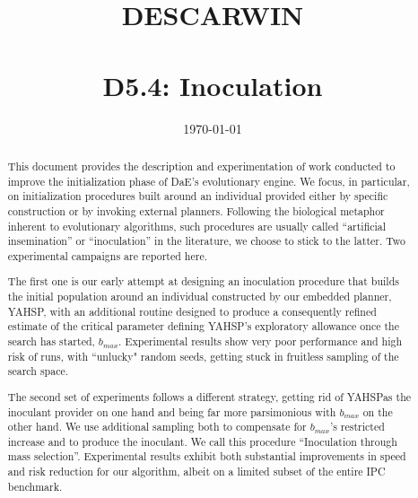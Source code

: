 \documentclass[english]{DESCARWINreport}
\title{DESCARWIN\\\bigskip {\em \LARGE The Marriage of Descartes and Darwin}\\\vspace{8cm} {\LARGE D5.4: Inoculation}}
\date{\today}
\newcommand{\YAHSP}{{\sc YAHSP}}
\begin{document}
\maketitle


\begin{revisions}
\begin{revtable}
\end{revtable}
\begin{revisionlabels}
\revlabel{}
\end{revisionlabels}
\end{revisions}

\begin{abstract}
This document provides the description and experimentation of work conducted to improve the initialization phase of DaE's evolutionary engine. We focus, in particular, on initialization procedures built around an individual provided either by specific construction or by invoking external planners. Following the biological metaphor inherent to evolutionary algorithms, such procedures are usually called ``artificial insemination'' or ``inoculation'' in the literature, we choose to stick to the latter. Two experimental campaigns are reported here. 

The first one is our early attempt at designing an inoculation procedure that builds the initial population around an individual constructed by our embedded planner, \YAHSP, with an additional routine designed to produce a consequently refined estimate of the critical parameter defining \YAHSP's exploratory allowance once the search has started, {$b_{max}$}. Experimental results show very poor performance and high risk of runs, with ``unlucky" random seeds, getting stuck in fruitless sampling of the search space. 

The second set of experiments follows a different strategy, getting rid of \YAHSP as the inoculant provider on one hand and being far more parsimonious with {$b_{max}$} on the other hand. We use additional sampling both to compensate for {$b_{max}$}'s restricted increase and to produce the inoculant. We call this procedure ``Inoculation through mass selection''. Experimental results exhibit both substantial improvements in speed and risk reduction for our algorithm, albeit on a limited subset of the entire IPC benchmark. 

\end{abstract}
\end{document}
